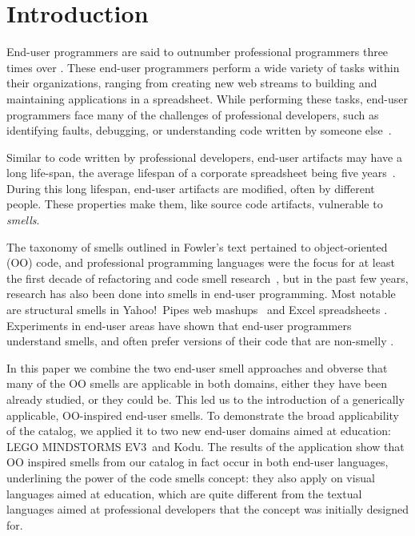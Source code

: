 \documentclass{sig-alternate}
\newcommand{\ms}{LEGO MINDSTORMS EV3}
\begin{document}
\section{Introduction}
End-user programmers are said to outnumber  professional programmers three times over \cite{Scaf2005}.
These end-user programmers perform a wide variety of tasks within their organizations, ranging from creating new web streams to building and maintaining applications in a spreadsheet. While performing these tasks, end-user programmers face many of the challenges of professional developers, such as identifying faults, debugging, or understanding code written by someone else~\cite{Ko2011}.

Similar to code written by professional developers, end-user artifacts may have a long life-span, the average lifespan of a corporate spreadsheet being five years~\cite{Hermans2011}. During this long lifespan, end-user artifacts are modified, often by different people.
These properties make them, like source code artifacts, vulnerable to \emph{smells}. 

The taxonomy of smells outlined in Fowler's text pertained to object-oriented (OO) code, and professional programming languages were the focus for at least the first decade of refactoring and code smell research~\cite{Mens:2004:SSR:972215.972286}, but in the past few years, research has also been done into smells in end-user programming. Most notable are structural smells in Yahoo!\ Pipes web mashups~\cite{Stolee2011} and Excel spreadsheets \cite{Hermans2012inter}. Experiments in end-user areas have shown that end-user programmers understand smells, and often prefer versions of their code that are non-smelly \cite{Hermans2012intra, StoleeTSE2013, chambers2013smell}. 


In this paper we combine the two end-user smell approaches and obverse that many of the OO smells are applicable in both domains, either they have been already studied, or they could be. This led us to the introduction of a generically applicable, OO-inspired end-user smells. To demonstrate the broad applicability of the catalog, we applied it to two new end-user domains aimed at education: \ms~and Kodu. The results of the application show that OO inspired smells from our catalog in fact occur in both end-user languages, underlining the power of the code smells concept: they also apply on visual languages aimed at education, which are quite different from the textual languages aimed at professional developers that the concept was initially designed for. 
\end{document}
